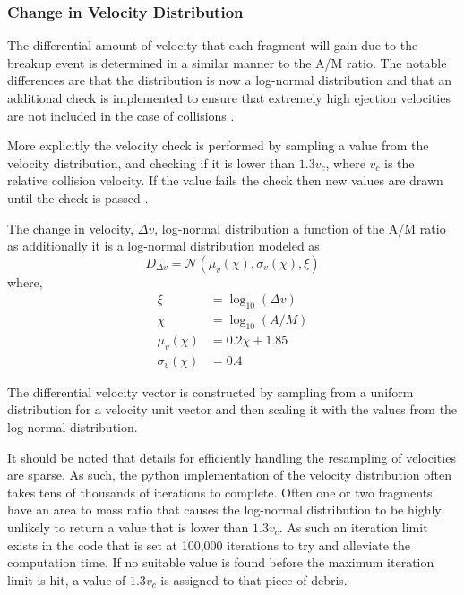 \documentclass{article}
\begin{document}
\subsubsection{Change in Velocity Distribution }
The differential amount of velocity that each fragment will gain due to the breakup event is determined in a similar manner to the A/M ratio. The notable differences are that the distribution is now a log-normal distribution and that an additional check is implemented to ensure that extremely high ejection velocities are not included in the case of collisions \citep{letizia_space_2016}. 

More explicitly the velocity check is performed by sampling a value from the velocity distribution, and checking if it is lower than $1.3v_c$, where $v_c$ is the relative collision velocity. If the value fails the check then new values are drawn until the check is passed \citep{letizia_space_2016}.

The change in velocity, $\Delta v$,  log-normal distribution a function of the A/M ratio as additionally it is a log-normal distribution modeled as
\begin{equation}
	D_{\Delta v}= \mathcal{N}(\mu_{v}(\chi), \sigma_{v}(\chi), \xi)
\end{equation}
\noindent where, \begin{align}
	\xi &= \log_{10}(\Delta v)\\
	\chi &= \log_{10}(A/M)\\
	\mu_{v}(\chi) &= 0.2\chi+1.85\\
	 \sigma_{v}(\chi) &= 0.4
\end{align}

The differential velocity vector is constructed by sampling from a uniform distribution for a velocity unit vector and then scaling it with the values from the log-normal distribution. 

It should be noted that details for efficiently handling the resampling of velocities are sparse. As such, the python implementation of the velocity distribution often takes tens of thousands of iterations to complete. Often one or two fragments have an area to mass ratio that causes the log-normal distribution to be highly unlikely to return a value that is lower than $1.3v_c$. As such an iteration limit exists in the code that is set at 100,000 iterations to try and alleviate the computation time. If no suitable value is found before the maximum iteration limit is hit, a value of $1.3v_c $ is assigned to that piece of debris.
\end{document}

